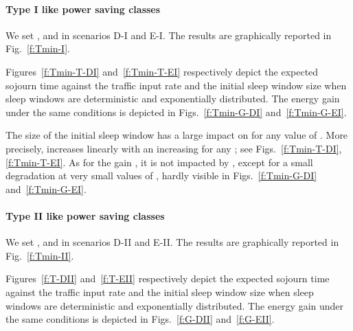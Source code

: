 \documentclass[journal]{IEEEtran}
\begin{document}
\paragraph{Type I like power saving classes}
We set ,  and  in scenarios D-I and E-I. The results are
graphically reported in Fig.~\ref{f:Tmin-I}.
\begin{figure*}[tb]
\begin{center}
\caption{Impact of  on  and  in type I like power saving classes.
\label{f:Tmin-I}}
\end{center}
\end{figure*}
Figures~\ref{f:Tmin-T-DI} and~\ref{f:Tmin-T-EI} respectively depict the expected sojourn time  against the traffic input rate  and the initial sleep window size  when sleep windows are deterministic and exponentially distributed. The energy gain under the same conditions is depicted in Figs.~\ref{f:Tmin-G-DI} and~\ref{f:Tmin-G-EI}.

The size of the initial sleep window has a large impact on  for any value of . More precisely,  increases linearly with an increasing  for any ; see Figs.~\ref{f:Tmin-T-DI},
\ref{f:Tmin-T-EI}. As for the gain , it is not impacted by , except for a small degradation at very small values of , hardly visible in Figs.~\ref{f:Tmin-G-DI} and~\ref{f:Tmin-G-EI}.
\paragraph{Type II like power saving classes}
We set ,  and  in scenarios D-II and E-II. The results are graphically
reported in Fig.~\ref{f:Tmin-II}.
\begin{figure*}[tb]
\begin{center}
\caption{Impact of  on  and  in type II like power saving classes.
\label{f:Tmin-II}}
\end{center}
\end{figure*}
Figures~\ref{f:T-DII} and~\ref{f:T-EII} respectively depict the expected sojourn time  against the traffic input rate  and the initial sleep window size  when sleep windows are
deterministic and exponentially distributed. The energy gain under the same conditions is depicted in Figs.~\ref{f:G-DII} and~\ref{f:G-EII}.
\end{document}
